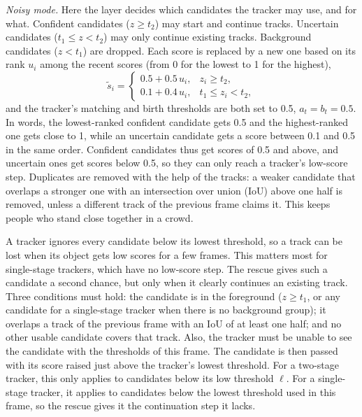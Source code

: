 \documentclass[pdflatex,sn-mathphys-num,iicol]{sn-jnl}
\makeatletter
\def\subsectionfont{\reset@font\fontfamily{\rmdefault}\fontsize{10bp}{12bp}\bfseries\selectfont\raggedright\boldmath}
\renewcommand\subsection{\@startsection{subsection}{2}{\z@}{-7pt \@plus -2pt \@minus -2pt}{3pt}{\subsectionfont}}
\makeatother
\begin{document}
\emph{Noisy mode.} Here the layer decides which candidates the tracker may
use, and for what. Confident candidates ($z\ge t_2$) may start and continue
tracks. Uncertain candidates ($t_1\le z<t_2$) may only continue existing
tracks. Background candidates ($z<t_1$) are dropped. Each score is replaced
by a new one based on its rank $u_i$ among the recent scores (from 0 for the
lowest to 1 for the highest),
\begin{equation}
\tilde{s}_i=
\begin{cases}
0.5+0.5\,u_i, & z_i\ge t_2,\\
0.1+0.4\,u_i, & t_1\le z_i<t_2,
\end{cases}
\label{eq:remap}
\end{equation}
and the tracker's matching and birth thresholds are both set to 0.5,
$a_t=b_t=0.5$. In words, the lowest-ranked confident candidate gets 0.5 and
the highest-ranked one gets close to 1, while an uncertain candidate gets a
score between 0.1 and 0.5 in the same order. Confident candidates thus get
scores of 0.5 and above, and
uncertain ones get scores below 0.5, so they can only reach a tracker's
low-score step. Duplicates are removed with the help of the tracks: a weaker
candidate that overlaps a stronger one with an intersection over union (IoU)
above one half is removed, unless a different track of the previous frame
claims it. This keeps people who stand close together in a crowd.

\subsection{Track continuation and camera motion}\label{sec:rescue}
A tracker ignores every candidate below its lowest threshold, so a track can
be lost when its object gets low scores for a few frames. This matters most
for single-stage trackers, which have no low-score step. The rescue gives
such a candidate a second chance, but only when it clearly continues an
existing track. Three conditions must hold: the candidate is in the
foreground ($z\ge t_1$, or any candidate for a single-stage tracker when
there is no background group); it overlaps a track of the previous frame
with an IoU of at least one half; and no other usable candidate covers that
track. Also, the tracker must be unable to see the candidate with the
thresholds of this frame. The candidate is then passed with its score raised
just above the tracker's lowest threshold. For a two-stage tracker, this only
applies to candidates below its low threshold $\ell$. For a single-stage
tracker, it applies to candidates below the lowest threshold used in this
frame, so the rescue gives it the continuation step it lacks.
\end{document}
